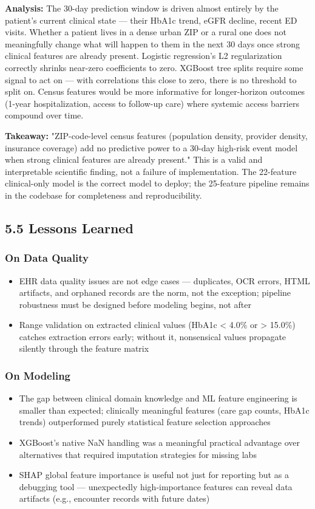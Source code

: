 \documentclass[11pt,a4paper]{article}
\begin{document}
\textbf{Analysis:} The 30-day prediction window is driven almost entirely by the patient's current clinical state --- their HbA1c trend, eGFR decline, recent ED visits. Whether a patient lives in a dense urban ZIP or a rural one does not meaningfully change what will happen to them in the next 30 days once strong clinical features are already present. Logistic regression's L2 regularization correctly shrinks near-zero coefficients to zero. XGBoost tree splits require some signal to act on --- with correlations this close to zero, there is no threshold to split on. Census features would be more informative for longer-horizon outcomes (1-year hospitalization, access to follow-up care) where systemic access barriers compound over time.

\textbf{Takeaway:} "ZIP-code-level census features (population density, provider density, insurance coverage) add no predictive power to a 30-day high-risk event model when strong clinical features are already present." This is a valid and interpretable scientific finding, not a failure of implementation. The 22-feature clinical-only model is the correct model to deploy; the 25-feature pipeline remains in the codebase for completeness and reproducibility.

\subsection{5.5 Lessons Learned}

\subsubsection{On Data Quality}
\begin{itemize}
\item EHR data quality issues are not edge cases --- duplicates, OCR errors, HTML artifacts, and orphaned records are the norm, not the exception; pipeline robustness must be designed before modeling begins, not after
\item Range validation on extracted clinical values (HbA1c < 4.0\% or > 15.0\%) catches extraction errors early; without it, nonsensical values propagate silently through the feature matrix
\end{itemize}

\subsubsection{On Modeling}
\begin{itemize}
\item The gap between clinical domain knowledge and ML feature engineering is smaller than expected; clinically meaningful features (care gap counts, HbA1c trends) outperformed purely statistical feature selection approaches
\item XGBoost's native NaN handling was a meaningful practical advantage over alternatives that required imputation strategies for missing labs
\item SHAP global feature importance is useful not just for reporting but as a debugging tool --- unexpectedly high-importance features can reveal data artifacts (e.g., encounter records with future dates)
\end{itemize}
\end{document}
